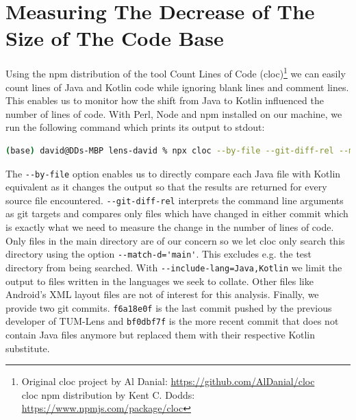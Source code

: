 \documentclass[
			   fontsize=11pt,
               paper=a4,
               bibliography=totoc,
               idxtotoc,
               headsepline,
               footsepline,
               footinclude=false,
               BCOR=12mm,
               DIV=13,
               openany,   %
               ]
               {scrbook}
\newcommand{\code}[1]{\lstinline[basicstyle = \ttfamily\small]{#1}} %
\begin{document}
\section{Measuring The Decrease of The Size of The Code Base} %

Using the npm distribution of the tool Count Lines of Code (cloc)\footnote{Original cloc project by Al Danial: \url{https://github.com/AlDanial/cloc}\\cloc npm distribution by Kent C. Dodds: \url{https://www.npmjs.com/package/cloc}} we can easily count lines of Java and Kotlin code while ignoring blank lines and comment lines. This enables us to monitor how the shift from Java to Kotlin influenced the number of lines of code. With Perl, Node and npm installed on our machine,
we run the following command which prints its output to stdout:

\begin{lstlisting}[style=standard, language=bash, label=code:cloc, caption={npx cloc command with its options and arguments. Prints the lines of code analysis comapring files before and after the Java to Kotlin conversion. The output was also saved as cloc.csv and can be found in lens-david/thesis/raw\_data.}]
	(base) david@DDs-MBP lens-david % npx cloc --by-file --git-diff-rel --match-d='main' --include-lang=Java,Kotlin -csv f6a18e0f 031a26a7
\end{lstlisting}

The \code{--by-file} option enables us to directly compare each Java file with Kotlin equivalent as it changes the output so that the results are returned for every source file encountered. \code{--git-diff-rel} interprets the command line arguments as git targets and compares only files which have changed in either commit which is exactly what we need to measure the change in the number of lines of code. Only files in the main directory are of our concern so we let cloc only search this directory using the option \code{--match-d='main'}. This excludes e.g. the test directory from being searched. With \code{--include-lang=Java,Kotlin} we limit the output to files written in the languages we seek to collate. Other files like Android's XML layout files are not of interest for this analysis. Finally, we provide two git commits. \code{f6a18e0f} is the last commit pushed by the previous developer of TUM-Lens and \code{bf0dbf7f} is the more recent commit that does not contain Java files anymore but replaced them with their respective Kotlin substitute.
\end{document}
